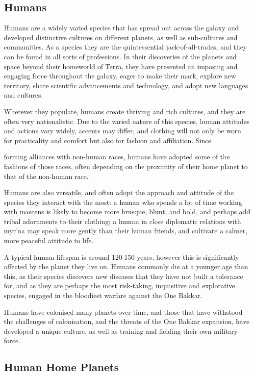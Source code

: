 \subsection{Humans}

Humans are a widely varied species that has spread out across the galaxy and developed distinctive cultures on different planets, as well as sub-cultures and communities. As a species they are the quintessential jack-of-all-trades, and they can be found in all sorts of professions. In their discoveries of the planets and space beyond their homeworld of Terra, they have presented an imposing and engaging force throughout the galaxy, eager to make their mark, explore new territory, share scientific advancements and technology, and adopt new languages and cultures.

Wherever they populate, humans create thriving and rich cultures, and they are often very nationalistic. Due to the varied nature of this species, human attitudes and actions vary widely, accents may differ, and clothing will not only be worn for practicality and comfort but also for fashion and affiliation. Since

forming alliances with non-human races, humans have adopted some of the fashions of those races, often depending on the proximity of their home planet to that of the non-human race.

Humans are also versatile, and often adopt the approach and attitude of the species they interact with the most: a human who spends a lot of time working with mascens is likely to become more brusque, blunt, and bold, and perhaps add tribal adornments to their clothing; a human in close diplomatic relations with myr'na may speak more gently than their human friends, and cultivate a calmer, more peaceful attitude to life.

A typical human lifespan is around 120-150 years, however this is significantly affected by the planet they live on. Humans commonly die at a younger age than this, as their species discovers new diseases that they have not built a tolerance for, and as they are perhaps the most risk-taking, inquisitive and explorative species, engaged in the bloodiest warfare against the One Bakkar.

Humans have colonised many planets over time, and those that have withstood the challenges of colonisation, and the threats of the One Bakkar expansion, have developed a unique culture, as well as training and fielding their own military force.

\subsection{Human Home Planets}

